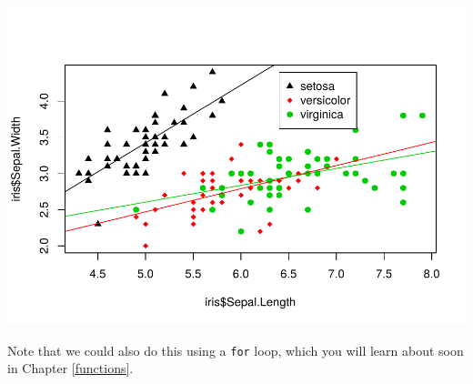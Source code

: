\documentclass[
]{krantz}
\begin{document}
\includegraphics{bookdown_files/figure-latex/unnamed-chunk-339-1.pdf}

Note that we could also do this using a \texttt{for} loop, which you will learn about soon in Chapter \ref{functions}.
\end{document}
